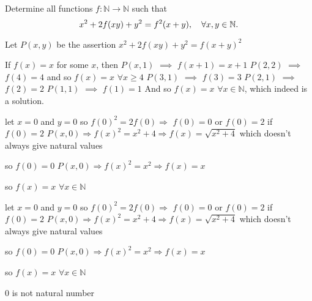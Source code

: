 \begin{solution}
	\begin{tcolorbox}Determine all functions $f : \mathbb{N} \to \mathbb{N}$ such that \[ x^2+2f(xy)+y^2=f^2(x+y), \ \ \ \forall x,y\in \Bbb{N}.\]\end{tcolorbox}
Let $P(x,y)$ be the assertion $x^2+2f(xy)+y^2=f(x+y)^2$

If $f(x)=x$ for some $x$, then $P(x,1)$ $\implies$ $f(x+1)=x+1$
$P(2,2)$ $\implies$ $f(4)=4$ and so $f(x)=x$ $\forall x\ge 4$
$P(3,1)$ $\implies$ $f(3)=3$
$P(2,1)$ $\implies$ $f(2)=2$
$P(1,1)$ $\implies$ $f(1)=1$
And so $\boxed{f(x)=x}$ $\forall x\in\mathbb N$, which indeed is a solution.
\end{solution}



\begin{solution}
	let $ x=0 $ and $ y=0 $
so $ f(0)^2=2f(0) \Rightarrow  $   $ f(0)=0 $  or   $ f(0)=2 $
if $ f(0)=2 $ 
$ P(x,0) \Rightarrow f(x)^2=x^2+4 \Rightarrow f(x)=\sqrt{x^2+4 } $ which doesn't always give natural values


so $ f(0)=0 $
$ P (x,0) \Rightarrow f(x)^2=x^2 \Rightarrow f(x)=x $

so $ f(x)=x $        $ \forall x\in \mathbb{N} $
\end{solution}



\begin{solution}
	\begin{tcolorbox}let $ x=0 $ and $ y=0 $
so $ f(0)^2=2f(0) \Rightarrow  $   $ f(0)=0 $  or   $ f(0)=2 $
if $ f(0)=2 $ 
$ P(x,0) \Rightarrow f(x)^2=x^2+4 \Rightarrow f(x)=\sqrt{x^2+4 } $ which doesn't always give natural values


so $ f(0)=0 $
$ P (x,0) \Rightarrow f(x)^2=x^2 \Rightarrow f(x)=x $

so $ f(x)=x $        $ \forall x\in \mathbb{N} $\end{tcolorbox}
 0  is not natural number
\end{solution}



